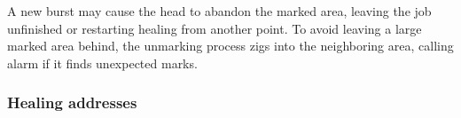 \documentclass[12pt]{memoir}
\newcommand{\E}{E}
\newcommand{\R}{R}
\begin{document}
A new burst may cause the head to abandon the marked area, leaving
the job unfinished or restarting healing from another point.
To avoid leaving a large marked area behind, the unmarking process zigs
into the neighboring area, calling alarm if it finds unexpected marks.




\subsubsection{Healing addresses}\label{sec:rec-addr}
\end{document}
